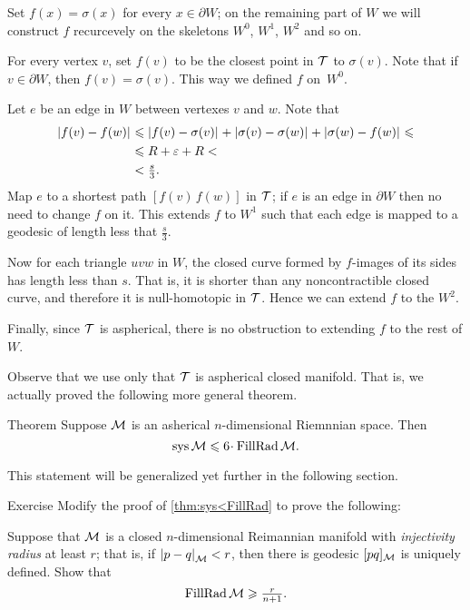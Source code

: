 Set $f(x)=\sigma(x)$ for every $x\in \partial W$;
on the remaining part of $W$ we will construct $f$ recurcevely on the skeletons $W^0$, $W^1$, $W^2$ and so on.

For every vertex $v$, set $f(v)$ to be the closest point in $\mathcal{T}$ to $\sigma(v)$.
Note that if $v\in\partial W$, then $f(v)=\sigma(v)$.
This way we defined $f$ on~$W^0$.

Let $e$ be an edge in $W$ between vertexes $v$ and $w$.
Note that 
\begin{align*}
\dist{f(v)}{f(w)}{}
&\le\dist{f(v)}{\sigma(v)}{}
+\dist{\sigma(v)}{\sigma(w)}{}
+\dist{\sigma(w)}{f(w)}{}\le
\\
&\le R+\eps +R<
\\
&<\tfrac s3.
\end{align*}
Map $e$ to a shortest path $[f(v)\,f(w)]$ in $\mathcal{T}$;
if $e$ is an edge in $\partial W$ then no need to change $f$ on it.
This extends $f$ to $W^1$ such that each edge is mapped to a geodesic of length less that $\tfrac s3$.

Now for each triangle $uvw$ in $W$, the closed curve formed by $f$-images of its sides has length less than $s$.
That is, it is shorter than any noncontractible closed curve,
and therefore it is null-homotopic in $\mathcal{T}$.
Hence we can extend $f$ to the $W^2$.

Finally, since $\mathcal{T}$ is aspherical, there is no obstruction to extending $f$ to the rest of $W$.
\qeds

Observe that we use only that $\mathcal{T}$ is aspherical closed manifold.
That is, we actually proved the following more general theorem.

\begin{thm}{Theorem}\label{thm:sys<FillRad+}
Suppose $\mathcal{M}$ is an asherical $n$-dimensional Riemnnian space.
Then 
\[\sys\spc{M}\le 6 \cdot \FillRad \spc{M}.\]
\end{thm}

This statement will be generalized yet further in the following section.

\begin{thm}{Exercise}\label{ex:fillrad-inj}
Modify the proof of \ref{thm:sys<FillRad} to prove the following:

Suppose that $\mathcal{M}$ is a closed $n$-dimensional Reimannian manifold with \emph{injectivity radius} at least $r$; that is, if $\dist{p}{q}{\spc{M}}<r$, then there is geodesic $[pq]_{\mathcal{M}}$ is uniquely defined.
Show that
\[\operatorname{\rm FillRad}\mathcal{M}\geqslant \tfrac{r}{n+1}.\]
 
\end{thm}

